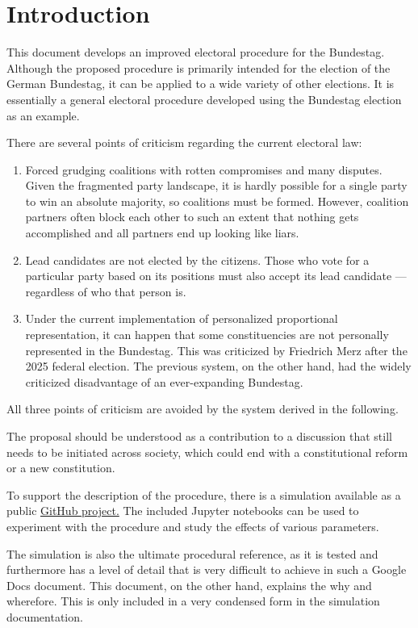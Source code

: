 \section{Introduction}

This document develops an improved electoral procedure for the Bundestag. Although
the proposed procedure is primarily intended for the election of the German Bundestag, it can
be applied to a wide variety of other elections. It is essentially a general
electoral procedure developed using the Bundestag election as an example.

There are several points of criticism regarding the current electoral law:
\begin{enumerate}
  \item Forced grudging coalitions with rotten compromises and many disputes.
    Given the fragmented party landscape, it is hardly possible for a single party to win an absolute
    majority, so coalitions must be formed. However, coalition partners often block each other
    to such an extent that nothing gets accomplished and all partners end up looking like liars.

  \item Lead candidates are not elected by the citizens. Those who vote for a particular party based on
    its positions must also accept its lead candidate --- regardless of who that person is.

  \item Under the current implementation of personalized proportional representation, it can
    happen that some constituencies are not personally represented in the Bundestag. This was
    criticized by Friedrich Merz after the 2025 federal election. The previous system, on the other hand,
    had the widely criticized disadvantage of an ever-expanding Bundestag.
\end{enumerate}

All three points of criticism are avoided by the system derived in the following.

The proposal should be understood as a contribution to a discussion that still needs to be initiated
across society, which could end with a constitutional reform or a new constitution.

To support the description of the procedure, there is a simulation available as a public
\href{https://github.com/danielschwalbe/ipres}{GitHub project.} The included Jupyter notebooks
can be used to experiment with the procedure and study the effects
of various parameters.

The simulation is also the ultimate procedural reference, as it is tested and furthermore
has a level of detail that is very difficult to achieve in such a Google Docs document.
This document, on the other hand, explains the why and wherefore. This is only included in a very
condensed form in the simulation documentation.
